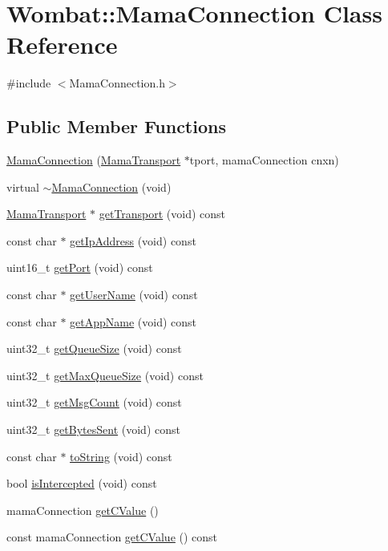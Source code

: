 \hypertarget{classWombat_1_1MamaConnection}{
\section{Wombat::MamaConnection Class Reference}
\label{classWombat_1_1MamaConnection}
}


{\ttfamily \#include $<$MamaConnection.h$>$}\subsection*{Public Member Functions}
\begin{DoxyCompactItemize}
\item 
\hyperlink{classWombat_1_1MamaConnection_a8f18c427d99091a878c841b4e944478e}{MamaConnection} (\hyperlink{classWombat_1_1MamaTransport}{MamaTransport} $\ast$tport, mamaConnection cnxn)
\item 
virtual \hyperlink{classWombat_1_1MamaConnection_a69556705b5c468e8a6259a1558f6b910}{$\sim$MamaConnection} (void)
\item 
\hyperlink{classWombat_1_1MamaTransport}{MamaTransport} $\ast$ \hyperlink{classWombat_1_1MamaConnection_abdae42ad143c06a15bdb8a4aa88570b7}{getTransport} (void) const 
\item 
const char $\ast$ \hyperlink{classWombat_1_1MamaConnection_ae8c6d8647f6d804eb97091ecb206ed68}{getIpAddress} (void) const 
\item 
uint16\_\-t \hyperlink{classWombat_1_1MamaConnection_a9ac7eb70faffc4eb1faeb26e0e27ea1e}{getPort} (void) const 
\item 
const char $\ast$ \hyperlink{classWombat_1_1MamaConnection_a6d20dc37510423cea3ffcf7071552aa9}{getUserName} (void) const 
\item 
const char $\ast$ \hyperlink{classWombat_1_1MamaConnection_af53c320dfce738424b478b31fa52abfc}{getAppName} (void) const 
\item 
uint32\_\-t \hyperlink{classWombat_1_1MamaConnection_a10311130758eab5e21e6eff252f14edf}{getQueueSize} (void) const 
\item 
uint32\_\-t \hyperlink{classWombat_1_1MamaConnection_a983177404505ec66b55f6746d170b399}{getMaxQueueSize} (void) const 
\item 
uint32\_\-t \hyperlink{classWombat_1_1MamaConnection_a54904b67b908397e14d86f1881277a2f}{getMsgCount} (void) const 
\item 
uint32\_\-t \hyperlink{classWombat_1_1MamaConnection_a545f8a3b6228e04251f4de66ebd69cd8}{getBytesSent} (void) const 
\item 
const char $\ast$ \hyperlink{classWombat_1_1MamaConnection_a03540a8a1e8b423803870ebeea514b8d}{toString} (void) const 
\item 
bool \hyperlink{classWombat_1_1MamaConnection_ac07ea9c4b10b04543db34fc35f1e2c6d}{isIntercepted} (void) const 
\item 
mamaConnection \hyperlink{classWombat_1_1MamaConnection_ae62786d245024af569ad40fef909df46}{getCValue} ()
\item 
const mamaConnection \hyperlink{classWombat_1_1MamaConnection_a3f89d84dbe3c026a74da54c3630729c4}{getCValue} () const 
\end{DoxyCompactItemize}


